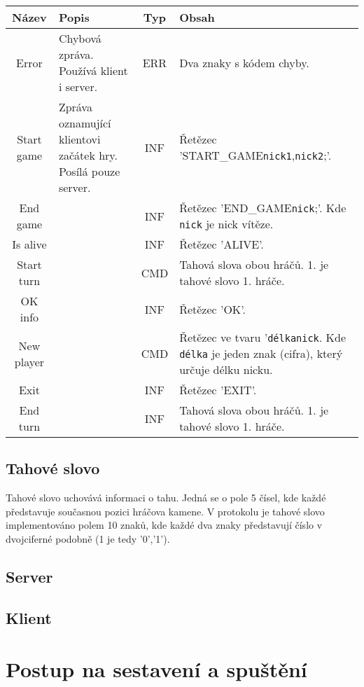 \documentclass[11pt,a4paper]{scrartcl}
\begin{document}
	\begin{tabular} {|c | p{5cm} | c | p{5cm} |}
		\hline
		Název & Popis & Typ & Obsah \\
		\hline
		\hline
		Error & Chybová zpráva. Používá klient i server. & ERR & Dva znaky s kódem chyby.\\
		\hline
		Start game & Zpráva oznamující klientovi začátek hry. Posílá pouze server.& INF & Řetězec 'START\_GAME\verb|nick1|,\verb|nick2|;'.\\
		\hline
		End game & & INF & Řetězec 'END\_GAME\verb|nick|;'. Kde \verb|nick| je nick vítěze. \\
		\hline
		Is alive & & INF &  Řetězec 'ALIVE'.\\
		\hline
		Start turn & & CMD &  Tahová slova obou hráčů. 1. je tahové slovo 1. hráče.\\
		\hline
		OK info & & INF &  Řetězec 'OK'.\\
		\hline
		New player & & CMD  & Řetězec ve tvaru '\verb|délka|\verb|nick|. Kde \verb|délka| je jeden znak (cifra), který určuje délku nicku.\\	
		\hline
		Exit & & INF &  Řetězec 'EXIT'.\\
		\hline
		End turn & & INF  & Tahová slova obou hráčů. 1. je tahové slovo 1. hráče.\\
		\hline
		
		\hline
	\end{tabular}

	\subsection{Tahové slovo}
	Tahové slovo uchovává informaci o tahu. Jedná se o pole 5 čísel, kde každé představuje současnou pozici hráčova kamene. V protokolu je tahové slovo implementováno polem 10 znaků, kde každé dva znaky představují číslo v dvojciferné podobně (1 je tedy '0','1').
		
	\subsection{Server}
	
	\subsection{Klient}
	
	\section{Postup na sestavení a spuštění}
\end{document}
